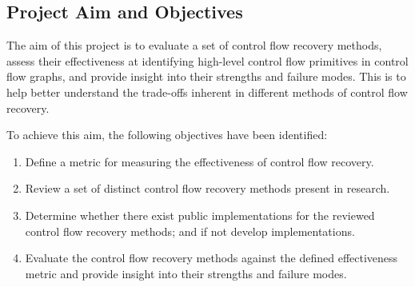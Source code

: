 
\subsection{Project Aim and Objectives}

The aim of this project is to evaluate a set of control flow recovery methods, assess their effectiveness at identifying high-level control flow primitives in control flow graphs, and provide insight into their strengths and failure modes. This is to help better understand the trade-offs inherent in different methods of control flow recovery.

To achieve this aim, the following objectives have been identified:

\begin{enumerate}
	\item \label{itm:obj_define_effectiveness_metric} Define a metric for measuring the effectiveness of control flow recovery.
	\item \label{itm:obj_review_cfa_methods} Review a set of distinct control flow recovery methods present in research.
	\item \label{itm:obj_cfa_components} Determine whether there exist public implementations for the reviewed control flow recovery methods; and if not develop implementations.
	\item \label{itm:obj_cfa_evaluation} Evaluate the control flow recovery methods against the defined effectiveness metric and provide insight into their strengths and failure modes.
\end{enumerate}
